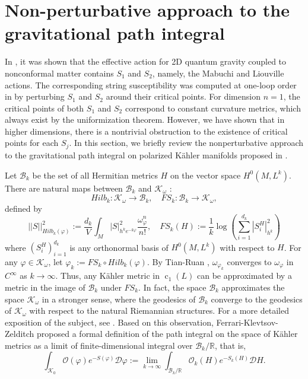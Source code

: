 \documentclass[12pt,reqno,a4paper]{amsart}
\numberwithin{equation}{section}
\DeclareMathOperator{\cc}{c}
\theoremstyle{remark}
\theoremstyle{dotless}
\begin{document}
\section{Non-perturbative approach to the gravitational path integral}\label{sectionpathint}

In \cite{ferrari2012gravitational}, it was shown that the effective action for 2D quantum gravity coupled to nonconformal matter contains $S_1$ and $S_2$, namely, the Mabuchi and Liouville actions. The corresponding string susceptibility was computed at one-loop order in \cite{bilal20142d} by perturbing $S_1$ and $S_2$ around their critical points. For dimension $
n=1$, the critical points of both $S_1$ and $S_2$ correspond to constant curvature metrics, which always exist by the uniformization theorem. However, we have shown that in higher dimensions, there is a nontrivial obstruction to the existence of critical points for each $S_j$. In this section, we briefly review the nonperturbative approach to the gravitational path integral on polarized Kähler manifolds proposed in \cite{ferrari2013random}.

Let $\mathcal{B}_k$ be the set of all Hermitian metrics $H$ on the vector space $H^0(M,L^k)$. There are natural maps between $\mathcal{B}_k$ and $\mathcal{K}_\omega$ :
\begin{equation*}
Hilb_k : \mathcal{K}_\omega \rightarrow \mathcal{B}_k,\quad FS_k : \mathcal{B}_k \rightarrow \mathcal{K}_\omega,
\end{equation*}
defined by
\begin{equation*}
||S||^2_{Hilb_k(\varphi)}:=\frac{d_k}{V}\int_M |S|^2_{h^ke^{-k\varphi}} \frac{\omega_\varphi^n}{n!},\quad FS_k(H):=\frac{1}{k}\log \left(\sum_{i=1}^{d_k}|S^H_i|^2_{h^k} \right)
\end{equation*}
where $(S^H_i)^{d_k}_{i=1}$ is any orthonormal basis of $H^0(M,L^k)$ with respect to $H$. For any $\varphi \in \mathcal{K}_\omega$, let $\varphi_k:=FS_k\circ Hilb_k(\varphi)$. By Tian-Ruan \cite{tian1990set,ruan1996canonical}, $\omega_{\varphi_k}$ converges to $\omega_\varphi$ in $C^\infty$ as $k\rightarrow\infty$. Thus, any K\"ahler metric in $\cc_1(L)$ can be approximated by a metric in the image of $\mathcal{B}_k$ under $FS_k$. In fact, the space $\mathcal{B}_k$ approximates the space $\mathcal{K}_\omega$ in a stronger sense, where the geodesics of $\mathcal{B}_k$ converge to the geodesics of $\mathcal{K}_\omega$ with respect to the natural Riemannian structures. For a more detailed exposition of the subject, see \cite{phong2007lectures,berman2011bergman}. Based on this observation, Ferrari-Klevtsov-Zelditch \cite{ferrari2013random} proposed a formal definition of the path integral on the space of K\"ahler metrics as a limit of finite-dimensional integral over $\mathcal{B}_k/\mathbb{R}$, that is,
\begin{equation*}
\int_{\mathcal{K}_0} \mathcal{O}(\varphi)e^{-S(\varphi)}\mathcal{D}\varphi :=\lim_{k\rightarrow\infty}\int_{\mathcal{B}_k/\mathbb{R}} \mathcal{O}_k(H)e^{-S_k(H)}\mathcal{D}H.
\end{equation*}
\end{document}

